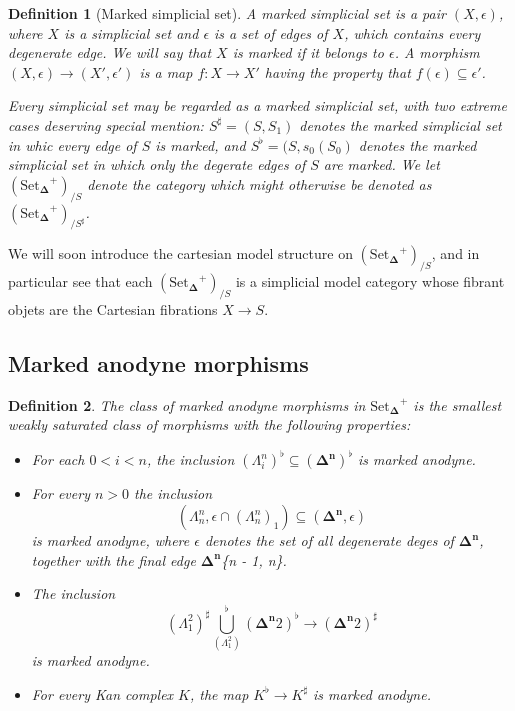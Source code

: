 \documentclass[12pt]{amsart}
\newcommand{\8}{\ensuremath{\infty}}
\newcommand{\Horn}[2]{\ensuremath{\Lambda^{#1}_{#2}}}
\newcommand{\Simplex}[1][n]{\ensuremath{\boldsymbol{\Delta^{#1}}}}
\newcommand{\SSet}{\ensuremath{\text{Set}_{\boldsymbol{\Delta}}}}
\newtheorem{definition}{Definition}
\begin{document}
{{\begin{definition}[Marked simplicial set]
  A marked simplicial set is a pair $(X, \epsilon)$, where $X$ is a simplicial set and $\epsilon$ is a set of edges of $X$, which contains every degenerate edge. We will say that $X$ is marked if it belongs to $\epsilon$. A morphism $(X, \epsilon) \rightarrow (X', \epsilon')$ is a map $f : X \rightarrow X'$ having the property that $f(\epsilon) \subseteq \epsilon'$.

  Every simplicial set may be regarded as a marked simplicial set, with two extreme cases deserving special mention: $S^\sharp = (S, S_1)$ denotes the marked simplicial set in whic every edge of $S$ is marked, and $S^\flat = (S, s_0(S_0)$ denotes the marked simplicial set in which only the degerate edges of $S$ are marked. We let $(\SSet^+)_{/S}$ denote the category which might otherwise be denoted as $(\SSet^+)_{/S^\sharp}$.
\end{definition}

We will soon introduce the cartesian model structure on $(\SSet^+)_{/S}$, and in particular see that each $(\SSet^+)_{/S}$ is a simplicial model category whose fibrant objets are the Cartesian fibrations $X \rightarrow S$.

\subsection{Marked anodyne morphisms}

\begin{definition}
  The class of marked anodyne morphisms in $\SSet^+$ is the smallest weakly saturated class of morphisms with the following properties:

  \begin{itemize}
    \item For each $0 < i < n$, the inclusion $(\Horn{n}{i})^\flat \subseteq (\Simplex)^\flat$ is marked anodyne.
    \item For every $n > 0$ the inclusion
          $$
            (\Horn{n}{n}, \epsilon \cap (\Horn{n}{n})_1) \subseteq (\Simplex, \epsilon)
          $$
          is marked anodyne, where $\epsilon$ denotes the set of all degenerate deges of \Simplex, together with the final edge \Simplex{\{n - 1, n\}}.
    \item The inclusion
          $$
            (\Horn{2}{1})^\sharp \bigcup_(\Horn{2}{1})^\flat (\Simplex{2})^\flat \rightarrow (\Simplex{2})^\sharp
          $$
          is marked anodyne.
    \item For every Kan complex $K$, the map $K^\flat \rightarrow K^\sharp$ is marked anodyne.
  \end{itemize}
\end{definition}

}}
\end{document}
